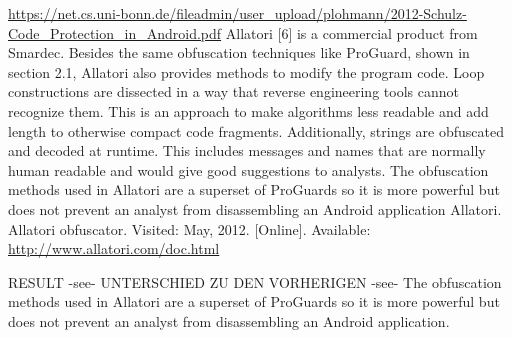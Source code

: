 \url{https://net.cs.uni-bonn.de/fileadmin/user_upload/plohmann/2012-Schulz-Code_Protection_in_Android.pdf}\newline
Allatori [6] is a commercial product from Smardec. Besides the same obfuscation techniques
like ProGuard, shown in section 2.1, Allatori also provides methods to modify the
program code. Loop constructions are dissected in a way that reverse engineering tools
cannot recognize them. This is an approach to make algorithms less readable and add
length to otherwise compact code fragments. Additionally, strings are obfuscated and decoded
at runtime. This includes messages and names that are normally human readable
and would give good suggestions to analysts.
The obfuscation methods used in Allatori are a superset of ProGuards so it is more
powerful but does not prevent an analyst from disassembling an Android application\newline
Allatori. Allatori obfuscator. Visited: May, 2012. [Online]. Available: \url{http://www.allatori.com/doc.html}


RESULT -see- UNTERSCHIED ZU DEN VORHERIGEN -see- The obfuscation methods used in Allatori are a superset of ProGuards so it is more powerful but does not prevent an analyst from disassembling an Android application.
